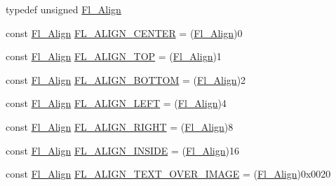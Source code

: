 \begin{DoxyCompactItemize}
\item 
typedef unsigned \hyperlink{_enumerations_8_h_a44e8bcd1e030e65e4f88cbae64a7c3e3}{Fl\+\_\+\+Align}
\item 
const \hyperlink{_enumerations_8_h_a44e8bcd1e030e65e4f88cbae64a7c3e3}{Fl\+\_\+\+Align} \hyperlink{_enumerations_8_h_a427f1ce53c37478a59f64bec4a2e2241}{F\+L\+\_\+\+A\+L\+I\+G\+N\+\_\+\+C\+E\+N\+T\+ER} = (\hyperlink{_enumerations_8_h_a44e8bcd1e030e65e4f88cbae64a7c3e3}{Fl\+\_\+\+Align})0
\item 
const \hyperlink{_enumerations_8_h_a44e8bcd1e030e65e4f88cbae64a7c3e3}{Fl\+\_\+\+Align} \hyperlink{_enumerations_8_h_a62b22e4022b39d90a2d3962ae144f2e8}{F\+L\+\_\+\+A\+L\+I\+G\+N\+\_\+\+T\+OP} = (\hyperlink{_enumerations_8_h_a44e8bcd1e030e65e4f88cbae64a7c3e3}{Fl\+\_\+\+Align})1
\item 
const \hyperlink{_enumerations_8_h_a44e8bcd1e030e65e4f88cbae64a7c3e3}{Fl\+\_\+\+Align} \hyperlink{_enumerations_8_h_a1ea3fa817f07b80dced581f58de842ae}{F\+L\+\_\+\+A\+L\+I\+G\+N\+\_\+\+B\+O\+T\+T\+OM} = (\hyperlink{_enumerations_8_h_a44e8bcd1e030e65e4f88cbae64a7c3e3}{Fl\+\_\+\+Align})2
\item 
const \hyperlink{_enumerations_8_h_a44e8bcd1e030e65e4f88cbae64a7c3e3}{Fl\+\_\+\+Align} \hyperlink{_enumerations_8_h_aee67f09771b16bc5da1f1ee860681be5}{F\+L\+\_\+\+A\+L\+I\+G\+N\+\_\+\+L\+E\+FT} = (\hyperlink{_enumerations_8_h_a44e8bcd1e030e65e4f88cbae64a7c3e3}{Fl\+\_\+\+Align})4
\item 
const \hyperlink{_enumerations_8_h_a44e8bcd1e030e65e4f88cbae64a7c3e3}{Fl\+\_\+\+Align} \hyperlink{_enumerations_8_h_a16646615fa4863fae6f7975b36c3987e}{F\+L\+\_\+\+A\+L\+I\+G\+N\+\_\+\+R\+I\+G\+HT} = (\hyperlink{_enumerations_8_h_a44e8bcd1e030e65e4f88cbae64a7c3e3}{Fl\+\_\+\+Align})8
\item 
const \hyperlink{_enumerations_8_h_a44e8bcd1e030e65e4f88cbae64a7c3e3}{Fl\+\_\+\+Align} \hyperlink{_enumerations_8_h_ade440c90fc9c2495fdf04c9cb34fba34}{F\+L\+\_\+\+A\+L\+I\+G\+N\+\_\+\+I\+N\+S\+I\+DE} = (\hyperlink{_enumerations_8_h_a44e8bcd1e030e65e4f88cbae64a7c3e3}{Fl\+\_\+\+Align})16
\item 
const \hyperlink{_enumerations_8_h_a44e8bcd1e030e65e4f88cbae64a7c3e3}{Fl\+\_\+\+Align} \hyperlink{_enumerations_8_h_ab6413c20d509320c27f498ef2d65ce3f}{F\+L\+\_\+\+A\+L\+I\+G\+N\+\_\+\+T\+E\+X\+T\+\_\+\+O\+V\+E\+R\+\_\+\+I\+M\+A\+GE} = (\hyperlink{_enumerations_8_h_a44e8bcd1e030e65e4f88cbae64a7c3e3}{Fl\+\_\+\+Align})0x0020
\item 

\end{DoxyCompactItemize}
